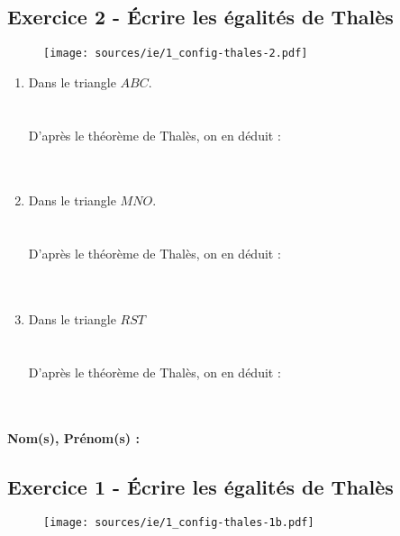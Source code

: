 \documentclass[12pt]{article}
\begin{document}
\subsection*{Exercice 2 - Écrire les égalités de Thalès}

\begin{figure}[H]
  \centering
  \texttt{[image: sources/ie/1\_config-thales-2.pdf]}
\end{figure}

\begin{multicols}{3}
  \begin{enumerate}
  \item Dans le triangle $ABC$.\\ 
  \phantom{abc}\\
  \phantom{abc}\\
  D'après le théorème de Thalès, on en déduit :\\
   \phantom{abc}\\
  \phantom{abc}\\
  \item Dans le triangle $MNO$.\\ 
  \phantom{abc}\\
  \phantom{abc}\\
  D'après le théorème de Thalès, on en déduit :\\
  \phantom{abc}\\
  \phantom{abc}\\
  \item Dans le triangle $RST$\\
  \phantom{abc}\\
  \phantom{abc}\\
  D'après le théorème de Thalès, on en déduit :\\
  \phantom{abc}\\
  \phantom{abc}\\
  \end{enumerate}
\end{multicols}

\newpage

\textbf{Nom(s), Prénom(s) :}

\subsection*{Exercice 1 - Écrire les égalités de Thalès}

\begin{figure}[H]
  \centering
  \texttt{[image: sources/ie/1\_config-thales-1b.pdf]}
\end{figure}
\end{document}
